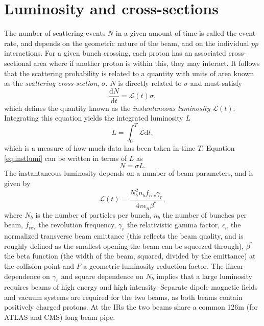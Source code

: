 
\clearpage
\section{Luminosity and cross-sections}

The number of scattering events $N$ in a given amount of time is called the event rate, and depends on the geometric nature of the beam, and on the individual $pp$ interactions. For a given bunch crossing, each proton has an associated cross-sectional area where if another proton is within this, they may interact. It follows that the scattering probability is related to a quantity with units of area known as the \textit{scattering cross-section}, $\sigma$. $N$ is directly related to $\sigma$ and must satisfy
\begin{equation}\label{eq:instlumi}
    \frac{\mathrm{d}N}{\mathrm{d}t}=\mathcal{L}(t)\sigma,
\end{equation}
which defines the quantity known as the \textit{instantaneous luminosity} $\mathcal{L}(t)$. Integrating this equation yields the integrated luminosity $L$
\begin{equation}
    L=\int_{0}^{T}\mathcal{L}\mathrm{d}t,
\end{equation}
which is a measure of how much data has been taken in time $T$. Equation \ref{eq:instlumi} can be written in terms of $L$ as \cite{Buckley:PCP}
\begin{equation}
    N=\sigma L.
\end{equation}
The instantaneous luminosity depends on a number of beam parameters, and is given by
\begin{equation} \label{eq:lumi_1}
    \mathcal{L}(t)=\frac{N_b^2n_bf_{rev}\gamma_r}{4\pi\epsilon_n\beta^*},
\end{equation}
where $N_b$ is the number of particles per bunch, $n_b$ the number of bunches per beam, $f_{\text{rev}}$ the revolution frequency, $\gamma_r$ the relativistic gamma factor, $\epsilon_n$ the normalized transverse beam emittance (this reflects the beam quality, and is roughly defined as the smallest opening the beam can be squeezed through), $\beta^*$ the beta function (the width of the beam, squared, divided by the emittance) at the collision point and $F$ a geometric luminosity reduction factor. The linear dependence on $\gamma_r$ and square dependence on $N_b$ implies that a large luminosity requires beams of high energy and high intensity. Separate dipole magnetic fields and vacuum systems are required for the two beams, as both beams contain positively charged protons. At the IRs the two beams share a common 126m (for ATLAS and CMS) long beam pipe.

